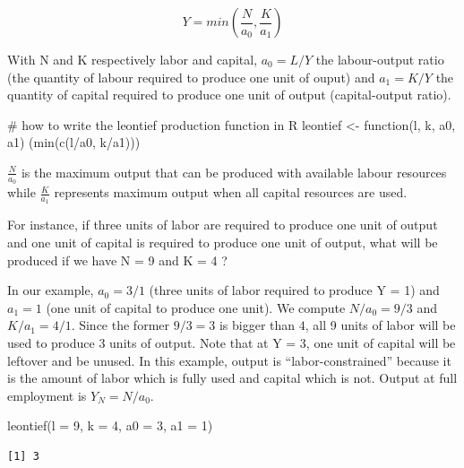 \documentclass[
  letterpaper,
  DIV=11,
  numbers=noendperiod]{scrreprt}
\newenvironment{Shaded}{\begin{snugshade}}{\end{snugshade}}
\newcommand{\AttributeTok}[1]{\textcolor[rgb]{0.40,0.45,0.13}{#1}}
\newcommand{\CommentTok}[1]{\textcolor[rgb]{0.37,0.37,0.37}{#1}}
\newcommand{\ControlFlowTok}[1]{\textcolor[rgb]{0.00,0.23,0.31}{#1}}
\newcommand{\DecValTok}[1]{\textcolor[rgb]{0.68,0.00,0.00}{#1}}
\newcommand{\FunctionTok}[1]{\textcolor[rgb]{0.28,0.35,0.67}{#1}}
\newcommand{\NormalTok}[1]{\textcolor[rgb]{0.00,0.23,0.31}{#1}}
\newcommand{\OtherTok}[1]{\textcolor[rgb]{0.00,0.23,0.31}{#1}}
\newcommand{\SpecialCharTok}[1]{\textcolor[rgb]{0.37,0.37,0.37}{#1}}
\begin{document}
\[
Y = min(\frac{N}{a_0}, \frac{K}{a_1})
\]

With N and K respectively labor and capital, \(a_0 = L/Y\) the
labour-output ratio (the quantity of labour required to produce one unit
of ouput) and \(a_1 = K/Y\) the quantity of capital required to produce
one unit of output (capital-output ratio).

\begin{Shaded}
\begin{Highlighting}[]
\CommentTok{\# how to write the leontief production function in R}
\NormalTok{leontief }\OtherTok{\textless{}{-}} \ControlFlowTok{function}\NormalTok{(l, k, a0, a1) (}\FunctionTok{min}\NormalTok{(}\FunctionTok{c}\NormalTok{(l}\SpecialCharTok{/}\NormalTok{a0, k}\SpecialCharTok{/}\NormalTok{a1)))}
\end{Highlighting}
\end{Shaded}

\(\frac{N}{a_0}\) is the maximum output that can be produced with
available labour resources while \(\frac{K}{a_1}\) represents maximum
output when all capital resources are used.

For instance, if three units of labor are required to produce one unit
of output and one unit of capital is required to produce one unit of
output, what will be produced if we have N = 9 and K = 4 ?

In our example, \(a_0 = 3/1\) (three units of labor required to produce
Y = 1) and \(a_1 = 1\) (one unit of capital to produce one unit). We
compute \(N/a_0 = 9/3\) and \(K/a_1 = 4/1\). Since the former
\(9/3 = 3\) is bigger than \(4\), all 9 units of labor will be used to
produce 3 units of output. Note that at Y = 3, one unit of capital will
be leftover and be unused. In this example, output is
``labor-constrained'' because it is the amount of labor which is fully
used and capital which is not. Output at full employment is
\(Y_N = N/a_0\).

\begin{Shaded}
\begin{Highlighting}[]
\FunctionTok{leontief}\NormalTok{(}\AttributeTok{l =} \DecValTok{9}\NormalTok{, }\AttributeTok{k =} \DecValTok{4}\NormalTok{, }\AttributeTok{a0 =} \DecValTok{3}\NormalTok{, }\AttributeTok{a1 =} \DecValTok{1}\NormalTok{)}
\end{Highlighting}
\end{Shaded}

\begin{verbatim}
[1] 3
\end{verbatim}
\end{document}
